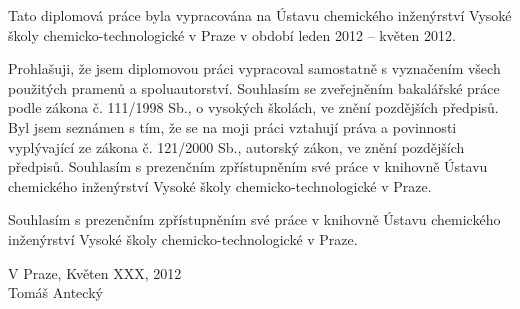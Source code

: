 Tato diplomová práce byla vypracována na Ústavu chemického inženýrství Vysoké školy chemicko-technologické v Praze v období leden 2012 -- květen 2012.


\vspace{16cm}
Prohlašuji, že jsem diplomovou práci vypracoval samostatně s vyznačením všech použitých pramenů a spoluautorství. Souhlasím se zveřejněním bakalářské práce podle zákona č. 111/1998 Sb., o vysokých školách, ve znění pozdějších předpisů. Byl jsem seznámen s tím, že se na moji práci vztahují práva a povinnosti vyplývající ze zákona č. 121/2000 Sb., autorský zákon, ve znění pozdějších předpisů. Souhlasím s prezenčním zpřístupněním své práce v knihovně Ústavu chemického inženýrství Vysoké školy chemicko-technologické v Praze.

Souhlasím s prezenčním zpřístupněním své práce v knihovně Ústavu chemického inženýrství Vysoké školy chemicko-technologické v Praze.

\vspace{1cm}
\noindent
V Praze, Květen XXX, 2012\\

\hfill Tomáš Antecký